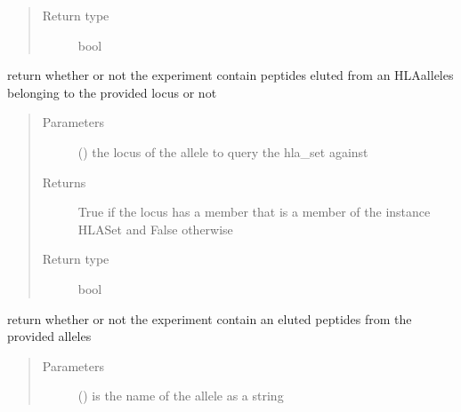 \documentclass[letterpaper,10pt,english]{sphinxmanual}
\begin{document}
\begin{fulllineitems}
\begin{fulllineitems}
\begin{quote}
\begin{description}
\item[{Return type}] \leavevmode
bool

\end{description}\end{quote}

\end{fulllineitems}


\begin{fulllineitems}
\label{\detokenize{IPTK.Classes:IPTK.Classes.Experiment.Experiment.has_gene}}
return whether or not the experiment contain peptides eluted from an HLA\sphinxhyphen{}alleles belonging to the provided locus or not
\begin{quote}\begin{description}
\item[{Parameters}] \leavevmode
{} () \textendash{} the locus of the allele to query the hla\_set against

\item[{Returns}] \leavevmode
True if the locus has a member that is a member of the instance HLASet and False otherwise

\item[{Return type}] \leavevmode
bool

\end{description}\end{quote}

\end{fulllineitems}


\begin{fulllineitems}
\label{\detokenize{IPTK.Classes:IPTK.Classes.Experiment.Experiment.has_hla_allele}}
return whether or not the experiment contain an eluted peptides from the provided alleles
\begin{quote}\begin{description}
\item[{Parameters}] \leavevmode
{} () \textendash{} is the name of the allele as a string


\end{description}
\end{quote}
\end{fulllineitems}
\end{fulllineitems}
\end{document}
